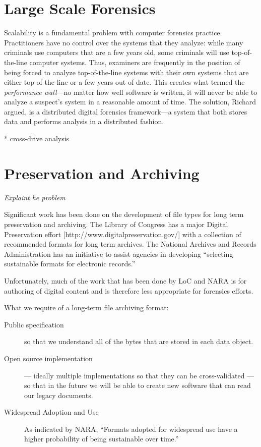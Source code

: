 \documentclass[11pt,letter]{article}
\newcommand{\citeN}[1]{\cite{#1}}
\begin{document}
\section{Large Scale Forensics}

Scalability is a fundamental problem with computer forensics
practice. Practitioners have no control over the systems that they
analyze: while many criminals use computers that are a few years old,
some criminals will use top-of-the-line computer systems. Thus,
examiners are frequently in the position of being forced to analyze
top-of-the-line systems with their own systems that are either
top-of-the-line or a few years out of date. This creates what
\citeN{dfrws2004:DrGoldenGRichardIII} 
termed the \emph{performance wall}---no matter how well software is
written, it will never be able to analyze a suspect's system in a
reasonable amount of time. The solution, Richard argued, is a
distributed digital forensics framework---a system that both stores
data and performs analysis in a distributed fashion.

* cross-drive analysis

\section{Preservation and Archiving}

\emph{Explaint he problem}

Significant work has been done on the development of file types for
long term preservation and archiving. The Library of Congress has a
major Digital Preservation effort
[http://www.digitalpreservation.gov/] with a collection of recommended
formats for long term archives.  The National Archives and Records
Administration has an initiative to assist agencies in developing
“selecting sustainable formats for electronic records.” 

Unfortunately, much of the work that has been done by LoC and NARA is
for authoring of digital content and is therefore less appropriate for
forensics efforts.

What we require of a long-term file archiving format:

\begin{description}
\item[Public specification] so that we understand all of the bytes that are stored in each data object.
\item[Open source implementation]— ideally multiple implementations so that they can be cross-validated — so that in the future we will be able to create new software that can read our legacy documents.
\item[Widespread Adoption and Use]  As indicated by NARA, “Formats adopted for widespread use have a higher probability of being sustainable over time.”   
\end{description}
\end{document}
